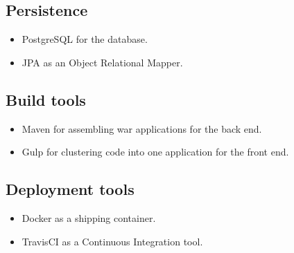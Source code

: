 \documentclass[11pt,a4paper]{article}
\begin{document}
\subsection{Persistence}
\begin{itemize}
	\item PostgreSQL for the database.
	\item JPA as an Object Relational Mapper.
\end{itemize}

\subsection{Build tools}
\begin{itemize}
	\item Maven for assembling war applications for the back end.
	\item Gulp for clustering code into one application for the front end.
\end{itemize}

\subsection{Deployment tools}
\begin{itemize}
	\item Docker as a shipping container.
	\item TravisCI as a Continuous Integration tool.
\end{itemize}
\end{document}

